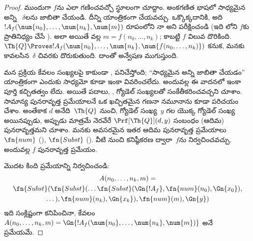 \documentclass[../../../include/open-logic-section]{subfiles}
\begin{document}
\begin{proof}
ముందుగా $f$ను ఎలా గణించవచ్చో స్థూలంగా చూద్దాం. అంకగణిత భాషలో సాధ్యమైన అన్ని ~$\delta$లను జాబితా
చేయండి. దీన్ని యాంత్రికంగా చేయవచ్చు. ఒక్కొక్కదానికి, అది
$!A_f(\num{n_0},\dots,\num{n_k},\num{m})$ రూపంలోని 
నా అని పరీక్షించండి (ఇది
లోని $f$కు ప్రాతినిధ్యం చేసే ). అలా అయితే
 వల్ల $m=f(n_0,\dots,n_k)$; కాబట్టి $f$ విలువ దొరికింది.
$\Th{Q}\Proves !A_f(\num{n_0},\dots,\num{n_k},
\num{f(n_0,\dots,n_k)})$ కనుక, మనకు కావలసిన~$\delta$ చివరకు దొరుకుతుంది. దాంతో అన్వేషణ
ముగుస్తుంది.

మన ప్రక్రియ కేవలం సంఖ్యలపై కాకుండా , 
పనిచేస్తోంది; ``సాధ్యమైన అన్ని  జాబితా చేయడం'' యాంత్రికంగా
ఎందుకు సాధ్యమో కూడా ఇంకా వివరించలేదు. అందువల్ల ఈ వాదనలో ఇంకా పూర్తి
కచ్చితత్వం లేదు. అయితే పదాలు, ,  గ్యోడెల్
సంఖ్యలతో సంకేతీకరించవచ్చని చూశాం. సామాన్య పునరావృత్త ప్రమేయాలనే ఒక ఖచ్చితమైన
గణనా నమూనాను కూడా పరిచయం చేశాం. అంతేకాక $d$ అనేది~$\Th{Q}$ నుంచి, గ్యోడెల్
సంఖ్య~$y$ గల   యొక్క గ్యోడెల్ సంఖ్య అయినప్పుడు,
అప్పుడు మాత్రమే నెరవేరే $\Prf[\Th{Q}](d,y)$ సంబంధం (ఆదిమ) పునరావృత్తమని
చూశాం. మనకు అవసరమైన ఇతర ఆదిమ పునరావృత్త ప్రమేయాలు $\fn{num}$
(), $\fn{Subst}$
(). వీటి నుంచి కనిష్ఠీకరణ ద్వారా~$f$ను
నిర్వచించవచ్చు. అందువల్ల $f$ పునరావృత్త ప్రమేయం.

మొదట కింది ప్రమేయాన్ని నిర్వచించండి:
\begin{multline*}
  A(n_0, \dots, n_k, m) = \\
  \fn{Subst}(\fn{Subst}(\dots\fn{Subst}(\Gn{!A_f}, \fn{num}(n_0), \Gn{x_0}),\\ \dots),
  \fn{num}(n_k),  \Gn{x_k}), \fn{num}(m), \Gn{y})
\end{multline*}
ఇది సంక్లిష్టంగా కనిపించినా, కేవలం
$A(n_0,\dots,n_k,m)=\Gn{!A_f(\num{n_0},\dots,\num{n_k},\num{m})}$ అనే
ప్రమేయమే.


\end{proof}
\end{document}
